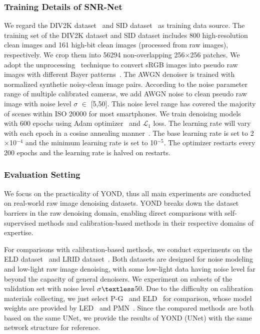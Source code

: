 \documentclass[lettersize,journal]{IEEEtran}
\begin{document}
	\subsubsection{\textbf{Training Details of SNR-Net}}
	We regard the DIV2K dataset~\cite{CVPR17/DIV2K} and SID dataset~\cite{CVPR18/SID} as training data source. The training set of the DIV2K dataset and SID dataset includes 800 high-resolution clean images and 161 high-bit clean images (processed from raw images), respectively. We crop them into 56294 non-overlapping 256$\times$256 patches. We adopt the unprocessing~\cite{CVPR19/Unprocess} technique to convert sRGB images into pseudo raw images with different Bayer patterns~\cite{CVPRW19/fhq}. The AWGN denoiser is trained with normalized synthetic noisy-clean image pairs. According to the noise parameter range of multiple calibrated cameras, we add AWGN noise to clean pseudo raw image with noise level $\sigma$ $\in$ [5,50]. This noise level range has covered the majority of scenes within ISO 20000 for most smartphones. We train denoising models with 600 epochs using Adam optimizer~\cite{Adam} and $\mathcal L_1$ loss. The learning rate will vary with each epoch in a cosine annealing manner~\cite{ICLR17/SGDR}. The base learning rate is set to 2$\times$10$^{-4}$ and the minimum learning rate is set to 10$^{-5}$. The optimizer restarts every 200 epochs and the learning rate is halved on restarts.
	
	\subsubsection{\textbf{Evaluation Setting}}
	We focus on the practicality of YOND, thus all main experiments are conducted on real-world raw image denoising datasets. YOND breaks down the dataset barriers in the raw denoising domain, enabling direct comparisons with self-supervised methods and calibration-based methods in their respective domains of expertise.
	
	For comparisons with calibration-based methods, we conduct experiments on the ELD dataset~\cite{TPAMI21/ELD} and LRID dataset~\cite{TPAMI23/PMN}. Both datasets are designed for noise modeling and low-light raw image denoising, with some low-light data having noise level far beyond the capacity of general denoisers. We experiment on subsets of the validation set with noise level $\sigma\textless$50. Due to the difficulty on calibration materials collecting, we just select P-G~\cite{P-G} and ELD~\cite{TPAMI21/ELD} for comparison, whose model weights are provided by LED~\cite{ICCV23/LED} and PMN~\cite{TPAMI23/PMN}. Since the compared methods are both based on the same UNet, we provide the results of YOND (UNet) with the same network structure for reference.
	
\end{document}
